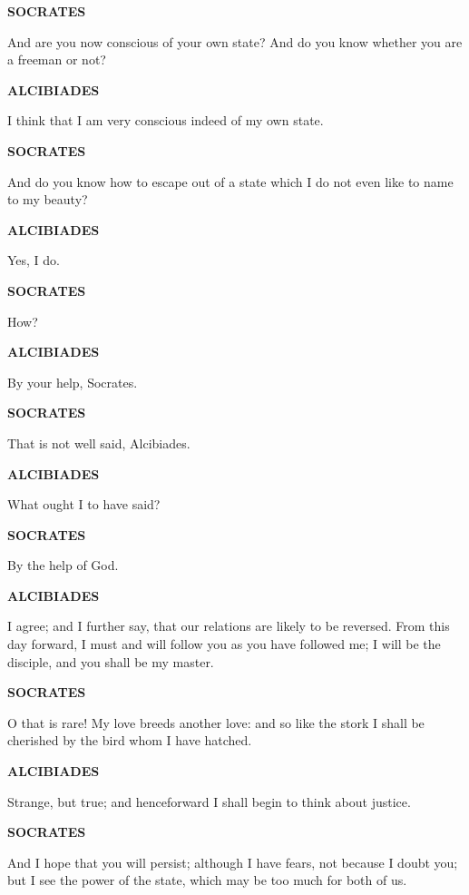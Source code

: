 \documentclass[11pt,letter]{article}
\begin{document}
\par \textbf{SOCRATES}
\par   And are you now conscious of your own state? And do you know whether you are a freeman or not?

\par \textbf{ALCIBIADES}
\par   I think that I am very conscious indeed of my own state.

\par \textbf{SOCRATES}
\par   And do you know how to escape out of a state which I do not even like to name to my beauty?

\par \textbf{ALCIBIADES}
\par   Yes, I do.

\par \textbf{SOCRATES}
\par   How?

\par \textbf{ALCIBIADES}
\par   By your help, Socrates.

\par \textbf{SOCRATES}
\par   That is not well said, Alcibiades.

\par \textbf{ALCIBIADES}
\par   What ought I to have said?

\par \textbf{SOCRATES}
\par   By the help of God.

\par \textbf{ALCIBIADES}
\par   I agree; and I further say, that our relations are likely to be reversed. From this day forward, I must and will follow you as you have followed me; I will be the disciple, and you shall be my master.

\par \textbf{SOCRATES}
\par   O that is rare! My love breeds another love:  and so like the stork I shall be cherished by the bird whom I have hatched.

\par \textbf{ALCIBIADES}
\par   Strange, but true; and henceforward I shall begin to think about justice.

\par \textbf{SOCRATES}
\par   And I hope that you will persist; although I have fears, not because I doubt you; but I see the power of the state, which may be too much for both of us.

\par 
\end{document}
